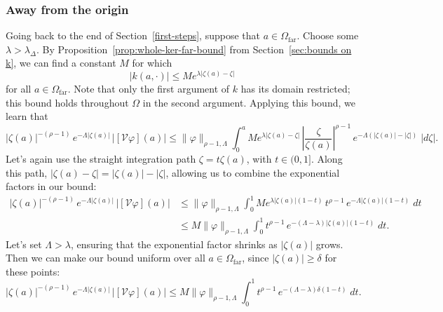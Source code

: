 \documentclass{article}
\theoremstyle{plain}
\newcommand{\volterra}{\mathcal{V}}
\newcommand{\domain}{\Omega}
\newcommand{\far}{\Omega_\text{far}}
\begin{document}
\subsubsection{Away from the origin}\label{far-bound}
Going back to the end of Section~\ref{first-steps}, suppose that $a \in \far$. Choose some $\lambda > \lambda_\Delta$. By Proposition~\ref{prop:whole-ker-far-bound} from Section~\ref{sec:bounds on k}, we can find a constant $M$ for which
\[ |k(a, \cdot)| \le M e^{\lambda |\zeta(a) - \zeta|} \]
for all $a \in \far$. Note that only the first argument of $k$ has its domain restricted; this bound holds throughout $\domain$ in the second argument. Applying this bound, we learn that
\[ |\zeta(a)|^{-(\rho-1)}\,e^{-\Lambda|\zeta(a)|}\,|[\volterra\varphi](a)| \le \|\varphi\|_{\rho-1, \Lambda} \int_0^a M e^{\lambda |\zeta(a) - \zeta|}\,\left|\frac{\zeta}{\zeta(a)}\right|^{\rho-1}\,e^{-\Lambda(|\zeta(a)| - |\zeta|)}\;|d\zeta|. \]
Let's again use the straight integration path $\zeta = t \zeta(a)$, with $t \in (0, 1]$. Along this path, $|\zeta(a) - \zeta| = |\zeta(a)| - |\zeta|$, allowing us to combine the exponential factors in our bound:
\begin{align*}
|\zeta(a)|^{-(\rho-1)}\,e^{-\Lambda|\zeta(a)|}\,|[\volterra\varphi](a)| & \le \|\varphi\|_{\rho-1, \Lambda} \int_0^1 M e^{\lambda |\zeta(a)|(1 - t)}\,t^{\rho-1}\,e^{-\Lambda |\zeta(a)|(1 - t)}\;dt \\
& \le M \|\varphi\|_{\rho-1, \Lambda} \int_0^1 t^{\rho-1}\,e^{-(\Lambda - \lambda)|\zeta(a)|(1 - t)}\;dt.
\end{align*}
Let's set $\Lambda > \lambda$, ensuring that the exponential factor shrinks as $|\zeta(a)|$ grows. Then we can make our bound uniform over all $a \in \far$, since $|\zeta(a)| \ge \delta$ for these points:
\[ |\zeta(a)|^{-(\rho-1)}\,e^{-\Lambda|\zeta(a)|}\,|[\volterra\varphi](a)| \le M \|\varphi\|_{\rho-1, \Lambda} \int_0^1 t^{\rho-1}\,e^{-(\Lambda - \lambda)\delta(1 - t)}\;dt. \]
\end{document}
